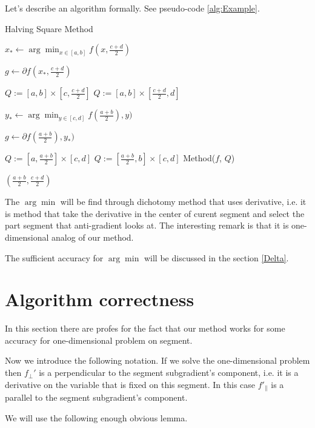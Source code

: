 \documentclass[12pt]{article}
\begin{document}
Let's describe an algorithm formally. See pseudo-code \ref{alg:Example}.

\begin{algorithm}[H]
\caption{Halving Square Method}\label{alg:Example}
\begin{algorithmic}[1]

$x_* \leftarrow \arg\min_{x\in[a,b]}f(x, \frac{c+d}{2})$
 
$g \leftarrow \partial f(x_*, \frac{c+d}{2})$
 
\State$Q := [a,b] \times [c, \frac{c+d}{2}]$ 
\Else
\State$Q := [a,b] \times [\frac{c+d}{2}, d]$ 
\EndIf

 $y_*\leftarrow \arg\min_{y\in[c,d]}f(\frac{a+b}{2}), y) $
 
 $g \leftarrow \partial f(\frac{a+b}{2}), y_*)$
 
 \State$Q := [a, \frac{a+b}{2}] \times [c, d]$ 
\Else
\State$Q := [\frac{a+b}{2},b] \times [c, d]$ 
\EndIf
{}
\State Method($f$, $Q$) 
\EndIf

\Return$(\frac{a+b}{2}, \frac{c+d}{2})$
\EndFunction 
 \end{algorithmic}
\end{algorithm}

The $\arg\min$ will be find through dichotomy method that uses derivative, i.e. it is method that take the derivative in the center of curent segment and select the part segment that anti-gradient looks at. The interesting remark is that it is one-dimensional analog of our method. 

The sufficient accuracy for $\arg\min$ will be discussed in the section \ref{Delta}.

\section{Algorithm correctness}

In this section there are profes for the fact that our method works for some accuracy for one-dimensional problem on segment.

Now we introduce the following notation. If we solve the one-dimensional problem then $f_\perp'$ is a perpendicular to the segment subgradient's component, i.e. it is a derivative on the variable that is fixed on this segment. In this case $f'_\parallel$ is a parallel to the segment subgradient's component.

We will use the following enough obvious lemma.
\end{document}
